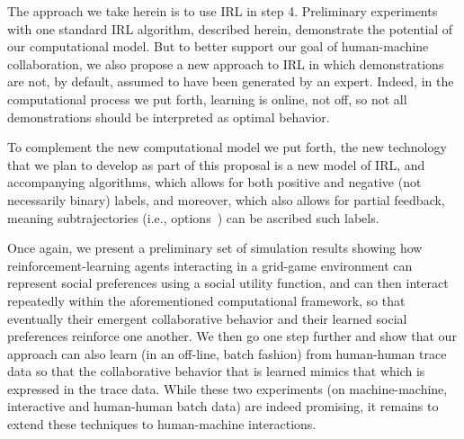 The approach we take herein is to use IRL in step 4.  Preliminary
experiments with one standard IRL algorithm, described herein,
demonstrate the potential of our computational model.
%
But to better support our goal of human-machine collaboration, we also
propose a new approach to IRL in which demonstrations are not, by
default, assumed to have been generated by an expert.  Indeed, in the
computational process we put forth, learning is online, not off, so
not all demonstrations should be interpreted as optimal behavior.

To complement the new computational model we put forth, the new
technology that we plan to develop as part of this proposal is a new
model of IRL, and accompanying algorithms, which allows for both
positive and negative (not necessarily binary) labels, and moreover,
which also allows for partial feedback, meaning subtrajectories (i.e.,
options~\cite{George?}) can be ascribed such
labels.  

Once again,
we present a preliminary set of simulation results showing how
reinforcement-learning agents interacting in a grid-game environment
can represent social preferences using a social utility function, and
can then interact repeatedly within the aforementioned computational
framework, so that eventually their emergent collaborative behavior
and their learned social preferences reinforce one another.  We then
go one step further and show that our approach can also learn (in an
off-line, batch fashion) from human-human trace data so that the
collaborative behavior that is learned mimics that which is expressed
in the trace data.  While these two experiments (on machine-machine,
interactive and human-human batch data) are indeed promising, it
remains to extend these techniques to human-machine interactions.

